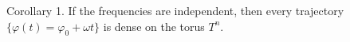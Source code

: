 Corollary 1. If the frequencies are independent, then every trajectory $\{\varphi(t) = \varphi_0 + \omega t\}$ is dense on the torus $T^n$.
